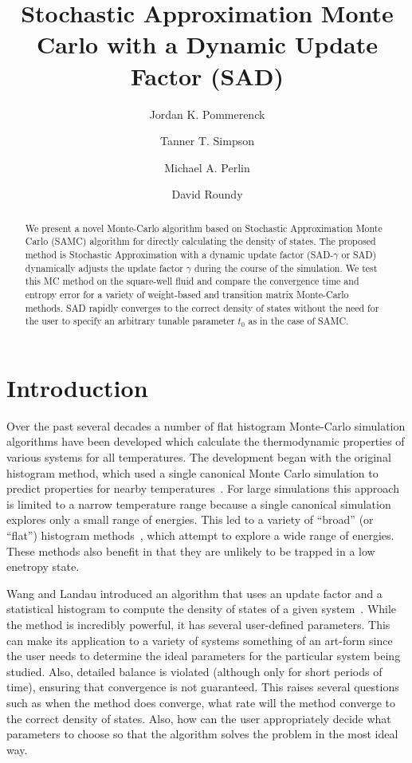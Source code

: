 \documentclass[letterpaper,twocolumn,amsmath,amssymb,pre,aps,10pt]{revtex4-1}
\begin{document}
\title{Stochastic Approximation Monte Carlo with a Dynamic Update
Factor (SAD)
}

\author{Jordan K. Pommerenck} \author{Tanner T. Simpson}
\author{Michael A. Perlin} \author{David Roundy}

\begin{abstract}
  We present a novel Monte-Carlo algorithm based on Stochastic
  Approximation Monte Carlo (SAMC) algorithm for directly calculating
  the density of states. The proposed method is Stochastic
  Approximation with a dynamic update factor (SAD-$\gamma$ or SAD)
  dynamically adjusts the update factor $\gamma$ during the course of
  the simulation. We test this MC method on the square-well fluid and
  compare the convergence time and entropy error for a variety of weight-based
  and transition matrix Monte-Carlo methods. SAD rapidly converges to the
  correct density of states without the need for the user to specify an
  arbitrary tunable parameter $t_0$ as in the case of SAMC.
\end{abstract}

\maketitle

\section{Introduction}
Over the past several decades a number of flat histogram Monte-Carlo
simulation algorithms have been developed which calculate the
thermodynamic properties of various systems for all temperatures.  The
development began with the original histogram method, which used a
single canonical Monte Carlo simulation to predict properties for
nearby temperatures~\cite{ferrenberg1988new}.  For large simulations
this approach is limited to a narrow temperature range because a single
canonical simulation explores only a small range of energies.  This led
to a variety of ``broad'' (or ``flat'') histogram
methods~\cite{penna1996broad, penna1998broad, swendsen1999transition,
wang2001determining, wang2001efficient, trebst2004optimizing}, which
attempt to explore a wide range of energies.  These methods also
benefit in that they are unlikely to be trapped in a low enetropy state.

Wang and Landau introduced an algorithm that uses an update factor and
a statistical histogram to compute the density of states of a given
system~\cite{wang2001determining, wang2001efficient}.  While the method
is incredibly powerful, it has several user-defined parameters.  This
can make its application to a variety of systems something of an
art-form since the user needs to determine the ideal parameters for the
particular system being studied.  Also, detailed balance is violated
(although only for short periods of time), ensuring that convergence is
not guaranteed.  This raises several questions such as when the method
does converge, what rate will the method converge to the correct
density of states. Also, how can the user appropriately decide what
parameters to choose so that the algorithm solves the problem in the
most ideal way.
\end{document}

